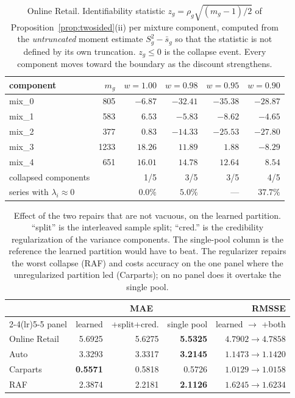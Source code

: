 \documentclass[twocolumn,10pt]{article}
\newcommand{\best}[1]{\textbf{#1}}
\begin{document}
\begin{table}[t]
\centering
\caption{Online Retail. Identifiability statistic
$z_g=\rho_g\sqrt{(m_g-1)/2}$ of
Proposition~\ref{prop:twosided}(ii) per mixture component, computed from
the \emph{untruncated} moment estimate $S_g^2-\bar s_g$ so that the
statistic is not defined by its own truncation. $z_g\le0$ is the collapse
event. Every component moves toward the boundary as the discount
strengthens.}
\label{tab:identifiability}
\begin{tabular}{lrrrrr}
\toprule
component & $m_g$ & $w{=}1.00$ & $w{=}0.98$ & $w{=}0.95$ & $w{=}0.90$\\
\midrule
mix\_0 & 805 & $-6.87$ & $-32.41$ & $-35.38$ & $-28.87$\\
mix\_1 & 583 & $6.53$ & $-5.83$ & $-8.62$ & $-4.65$\\
mix\_2 & 377 & $0.83$ & $-14.33$ & $-25.53$ & $-27.80$\\
mix\_3 & 1233 & $18.26$ & $11.89$ & $1.88$ & $-8.29$\\
mix\_4 & 651 & $16.01$ & $14.78$ & $12.64$ & $8.54$\\
\midrule
collapsed components & & 1/5 & 3/5 & 3/5 & 4/5\\
series with $\lambda_i\!\approx\!0$ & & $0.0\%$ & $5.0\%$ & --- & $37.7\%$\\
\bottomrule
\end{tabular}
\end{table}

\begin{table}[t]
\centering
\caption{Effect of the two repairs that are not vacuous, on the learned
partition. ``split'' is the interleaved sample split; ``cred.'' is the
credibility regularization of the variance components. The single-pool
column is the reference the learned partition would have to beat. The
regularizer repairs the worst collapse (RAF) and costs accuracy on the
one panel where the unregularized partition led (Carparts); on no panel
does it overtake the single pool.}
\label{tab:repairs}
\begin{tabular}{lrrrr}
\toprule
& \multicolumn{3}{c}{MAE} & RMSSE\\
\cmidrule(lr){2-4}\cmidrule(lr){5-5}
panel & learned & \;+split+cred. & single pool & learned $\to$ +both\\
\midrule
Online Retail & 5.6925 & 5.6275 & \best{5.5325} & $4.7902\to4.7858$\\
Auto & 3.3293 & 3.3317 & \best{3.2145} & $1.1473\to1.1420$\\
Carparts & \best{0.5571} & 0.5818 & 0.5726 & $1.0129\to1.0158$\\
RAF & 2.3874 & 2.2181 & \best{2.1126} & $1.6245\to1.6234$\\
\bottomrule
\end{tabular}
\end{table}
\end{document}

